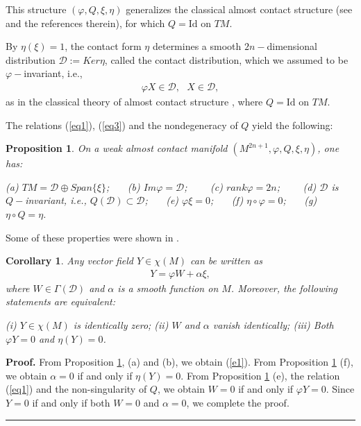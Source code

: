 \documentclass{article}
\newtheorem{corollary}[theorem]{Corollary}
\newtheorem{proposition}[theorem]{Proposition}
\newenvironment{proof}[1][Proof]{\noindent\textbf{#1.} }{\ \rule{0.5em}{0.5em}}
\begin{document}
This structure $(\varphi,Q,\xi,\eta)$ generalizes the classical almost contact structure (see \cite {Blair} and the references therein), for which $Q=\text{Id}$ on $TM$.\medskip

 By $\eta(\xi)=1$, the contact form $\eta$ determines a smooth $2n-$dimensional distribution $\mathcal{D}:=Ker\eta$, called the contact distribution, which we assumed to be $\varphi-$invariant, i.e., 
\begin{eqnarray}
	\varphi X\in\mathcal{D}, \ \ \ X\in\mathcal{D},  \label{eq3}
\end{eqnarray}
as  in the classical theory of almost contact structure \cite{Blair}, where $Q=\text{Id}$ on $TM$.\medskip

\noindent The relations (\ref{eq1}), (\ref{eq3}) and the nondegeneracy of $Q$ yield the following:

\begin{proposition} \label{p1}
On a weak almost contact manifold $(M^{2n+1},\varphi,Q,\xi,\eta)$, one has:\medskip

\noindent (a) $TM=\mathcal{D}\oplus Span\{\xi\}$; \ \ \ (b) $Im\varphi=\mathcal{D}$; \ \ \ \ (c) $rank \varphi=2n$; \ \ \ \ (d) $\mathcal{D}$ is $Q-$invariant, i.e., $Q(\mathcal{D})\subset\mathcal{D}$;      \ \ \ (e) $\varphi\xi=0$;   \ \ \  (f) $\eta\circ\varphi=0$;  \ \ \ (g) $\eta\circ Q=\eta$. 
\end{proposition}

\noindent Some of these properties were shown in \cite{Rovenski1}. \medskip

\begin{corollary} \label{l1}
	\noindent Any vector field $Y\in\chi(M)$ can be written as 
	\begin{eqnarray}
		Y=\varphi W+\alpha\xi, \label{e1}
	\end{eqnarray}
	where $W\in\Gamma(\mathcal{D})$ and $\alpha$ is a smooth function on $M$. Moreover, the following statements are equivalent:\medskip
	
	\noindent (i) $Y\in\chi(M)$ is identically zero; (ii) $W$ and $\alpha$ vanish identically; (iii) Both $\varphi Y=0$ and $\eta(Y)=0$.

\end{corollary}
\begin{proof}
	From Proposition \ref{p1}, (a) and (b), we obtain (\ref{e1}). From Proposition \ref{p1} (f), we obtain $\alpha=0$ if and only if $\eta(Y)=0$. From Proposition \ref{p1} (e), the relation (\ref{eq1}) and the non-singularity of $Q$, we obtain $W=0$ if and only if $\varphi Y=0$. Since $Y=0$ if and only if both $W=0$ and $\alpha =0$, we complete the proof.	
\end{proof}\medskip
\end{document}
